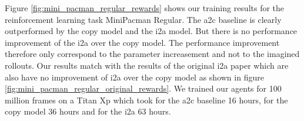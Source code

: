 
Figure \ref{fig:mini_pacman_regular_rewards} shows our training results for the reinforcement learning task MiniPacman Regular. The a2c baseline is clearly outperformed by the copy model and the i2a model. But there is no performance improvement of the i2a over the copy model. The performance improvement therefore only correspond to the parameter increasement and not to the imagined rollouts. 
Our results match with the results of the original i2a paper which are also have no improvement of i2a over the copy model as shown in figure \ref{fig:mini_pacman_regular_original_rewards}.
We trained our agents for 100 million frames on a Titan Xp which took for the a2c baseline 16 hours, for the copy model 36 hours and for the i2a 63 hours.


